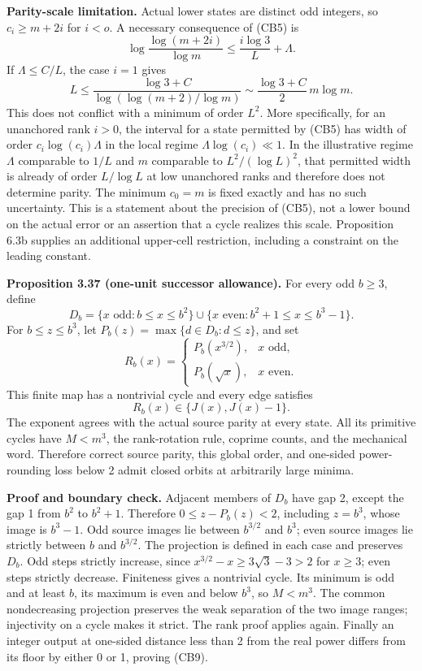 \documentclass[12pt]{article}
\begin{document}
\textbf{Parity-scale limitation.} Actual lower states are distinct odd
integers, so \(c_i\ge m+2i\) for \(i<o\). A necessary consequence of
(CB5) is \[
\log\frac{\log(m+2i)}{\log m}
\le\frac{i\log3}{L}+\Lambda.
\] If \(\Lambda\le C/L\), the case \(i=1\) gives \[
L\le\frac{\log3+C}{\log(\log(m+2)/\log m)}
\sim\frac{\log3+C}{2}\,m\log m.
\] This does not conflict with a minimum of order \(L^2\). More
specifically, for an unanchored rank \(i>0\), the interval for a state
permitted by (CB5) has width of order \(c_i\log(c_i)\Lambda\) in the
local regime \(\Lambda\log(c_i)\ll1\). In the illustrative regime
\(\Lambda\) comparable to \(1/L\) and \(m\) comparable to
\(L^2/(\log L)^2\), that permitted width is already of order
\(L/\log L\) at low unanchored ranks and therefore does not determine
parity. The minimum \(c_0=m\) is fixed exactly and has no such
uncertainty. This is a statement about the precision of (CB5), not a
lower bound on the actual error or an assertion that a cycle realizes
this scale. Proposition 6.3b supplies an additional upper-cell
restriction, including a constraint on the leading constant.

\textbf{Proposition 3.37 (one-unit successor allowance).} For every odd
\(b\ge3\), define \[
D_b=\{x\text{ odd}:b\le x\le b^2\}
\cup\{x\text{ even}:b^2+1\le x\le b^3-1\}.
\] For \(b\le z\le b^3\), let \(P_b(z)=\max\{d\in D_b:d\le z\}\), and
set \[
R_b(x)=\begin{cases}
P_b(x^{3/2}),&x\text{ odd},\\
P_b(\sqrt x),&x\text{ even}.
\end{cases}
\] This finite map has a nontrivial cycle and every edge satisfies \[
R_b(x)\in\{J(x),J(x)-1\}.
\tag{CB9}
\] The exponent agrees with the actual source parity at every state. All
its primitive cycles have \(M<m^3\), the rank-rotation rule, coprime
counts, and the mechanical word. Therefore correct source parity, this
global order, and one-sided power-rounding loss below 2 admit closed
orbits at arbitrarily large minima.

\textbf{Proof and boundary check.} Adjacent members of \(D_b\) have gap
2, except the gap 1 from \(b^2\) to \(b^2+1\). Therefore
\(0\le z-P_b(z)<2\), including \(z=b^3\), whose image is \(b^3-1\). Odd
source images lie between \(b^{3/2}\) and \(b^3\); even source images
lie strictly between \(b\) and \(b^{3/2}\). The projection is defined in
each case and preserves \(D_b\). Odd steps strictly increase, since
\(x^{3/2}-x\ge3\sqrt3-3>2\) for \(x\ge3\); even steps strictly decrease.
Finiteness gives a nontrivial cycle. Its minimum is odd and at least
\(b\), its maximum is even and below \(b^3\), so \(M<m^3\). The common
nondecreasing projection preserves the weak separation of the two image
ranges; injectivity on a cycle makes it strict. The rank proof applies
again. Finally an integer output at one-sided distance less than 2 from
the real power differs from its floor by either 0 or 1, proving (CB9).
\end{document}
